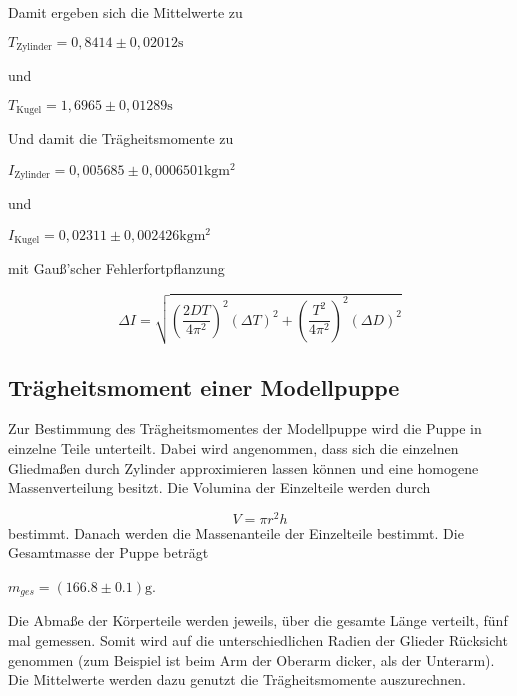 Damit ergeben sich die Mittelwerte zu 

\begin{center}
  $T_{\text{Zylinder}} = 0,8414 \pm 0,02012 \si{\second} $
\end{center}

und

\begin{center}
  $ T_{\text{Kugel}} = 1,6965 \pm 0,01289 \si{\second} $
\end{center}

Und damit die Trägheitsmomente zu

\begin{center}
  $ I_{\text{Zylinder}} = 0,005685 \pm 0,0006501 \si{\kilogram\meter^2} $ 
\end{center}

und

\begin{center}
  $ I_{\text{Kugel}} = 0,02311 \pm 0,002426 \si{\kilogram\meter^2} $
\end{center}

mit Gauß'scher Fehlerfortpflanzung

\begin{equation}
  \Delta I = \sqrt{ (\frac{2DT}{4\pi^2})^2  (\Delta T)^2 + (\frac{T^2}{4\pi^2})^2 (\Delta D)^2}
  \label{fig:Fehlerfortpflanzung}
\end{equation}


\subsection{Trägheitsmoment einer Modellpuppe}
\label{sec:Trägheitsmoment einer Modellpuppe}

Zur Bestimmung des Trägheitsmomentes der Modellpuppe wird die Puppe in einzelne Teile unterteilt. Dabei wird angenommen,
dass sich die einzelnen Gliedmaßen durch Zylinder approximieren lassen können und eine homogene Massenverteilung besitzt. Die
Volumina der Einzelteile werden durch

\begin{equation}
  V = \pi r^2h
  \label{eqn:Volumen}
\end{equation}
bestimmt. Danach werden die Massenanteile der Einzelteile bestimmt. Die Gesamtmasse der Puppe beträgt 

\begin{center}
  $m_{ges} = (166.8\pm 0.1)\si{\gram}$.
\end{center}

Die Abmaße der Körperteile werden jeweils, über die gesamte Länge verteilt, fünf mal gemessen. Somit wird auf die unterschiedlichen
Radien der Glieder Rücksicht genommen (zum Beispiel ist beim Arm der Oberarm dicker, als der Unterarm). Die Mittelwerte werden dazu genutzt die
Trägheitsmomente auszurechnen.

